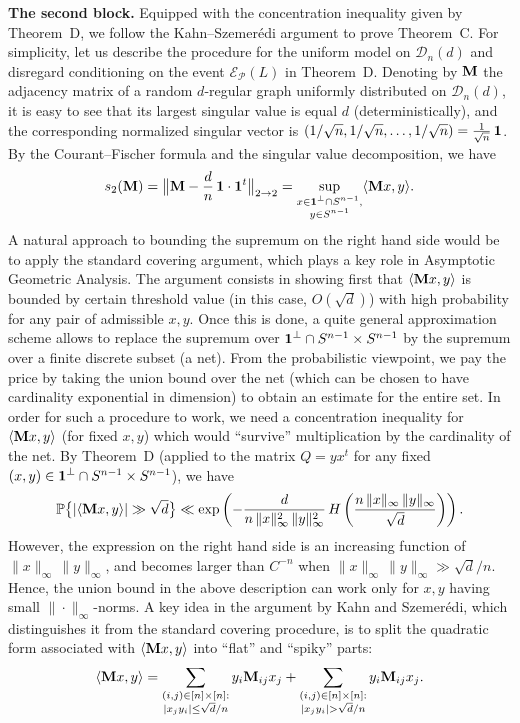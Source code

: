 \documentclass[12pt]{article}
\theoremstyle{definition}
\theoremstyle{plain}
\newcommand{\Event}{\mathcal{E}}
\def\ranmtx{{\bf{}M}}
\def\vofones{{\bf{}1}}
\def\Prob{{\mathbb P}}
\def\DGraphSet{{\mathcal D}_n}
\def\pvector{{\mathcal P}}
\begin{document}
{\bf The second block.} 
Equipped with the concentration inequality given by Theorem~D,
we follow the Kahn--Szemer\'edi argument \cite{FKS} to prove Theorem~C. 
For simplicity, let us describe the procedure for the uniform model on $\DGraphSet(d)$
and disregard conditioning on the event $\Event_\pvector(L)$ in Theorem~D.
Denoting by $\ranmtx$ the adjacency matrix of a random $d$-regular graph uniformly
distributed on $\DGraphSet(d)$,
it is easy to see that its largest singular value is equal $d$ (deterministically), and the corresponding normalized
singular vector is $(1/\sqrt{n},1/\sqrt{n},\ldots,1/\sqrt{n})=\frac{1}{\sqrt{n}}\,\vofones$.
By the Courant--Fischer formula and the singular value decomposition, we have
$$
s_2(\ranmtx)
=\big\Vert \ranmtx-\frac{d}{n}\, \vofones\cdot\vofones^t\big\Vert_{2\to 2}
=\sup_{\substack{x\in  \vofones^\perp\cap S^{n-1},\\ y\in S^{n-1}} } \langle \ranmtx x,y\rangle.
$$
A natural approach to bounding the supremum on the right hand side would be to apply
the standard covering argument, which plays a key role in Asymptotic Geometric Analysis.
The argument
consists in showing first that
$\langle \ranmtx x,y\rangle$ is bounded by certain threshold value (in this case, $O(\sqrt{d})$) with high probability
for any pair of admissible $x,y$. 
Once this is done, a quite general approximation scheme allows to replace the supremum over 
$\vofones^\perp\cap S^{n-1}\times S^{n-1}$ by the supremum over a finite discrete subset (a net).
From the probabilistic viewpoint, we pay the price by taking the union bound over the net
(which can be chosen to have cardinality exponential in dimension)
to obtain an estimate for the entire set.
In order for such a procedure to work,
we need a concentration inequality for $\langle \ranmtx x,y\rangle$ (for fixed $x,y$) which would
``survive'' multiplication by the cardinality of the net.
By Theorem~D (applied to the matrix $Q=yx^t$ for any fixed $(x,y)\in \vofones^\perp\cap S^{n-1}\times S^{n-1}$), 
we have
$$
\Prob\big\{\vert \langle \ranmtx x,y\rangle\vert \gg\sqrt{d}\big\}\ll \exp\left(-\frac{d}{n\,\|x\|_\infty^2\,\|y\|_\infty^2 }
\, H\left(\frac{n\, \|x\|_\infty\, \|y\|_\infty}{\sqrt{d}}\right)\right).
$$
However, the expression on the right hand side is an increasing function of $\|x\|_\infty\, \|y\|_\infty$,
and becomes larger than $C^{-n}$ when $\|x\|_\infty\, \|y\|_\infty\gg \sqrt{d}/n$.
Hence, the union bound in the above description can work only for $x,y$ having small $\|\cdot\|_\infty$-norms.
A key idea in the argument by Kahn and Szemer\'edi, which distinguishes it from the standard covering procedure,
is to split the quadratic form associated with $\langle \ranmtx x,y\rangle$
into ``flat'' and ``spiky'' parts:
\begin{equation}\label{eq: intro-flat-spike}
\langle \ranmtx x,y\rangle
= \sum_{\substack{(i,j)\in [n]\times[n]:\\\vert x_jy_i\vert \leq \sqrt{d}/n}} y_i\ranmtx_{ij}x_j 
+  \sum_{\substack{(i,j)\in[n]\times[n]:\\\vert x_jy_i\vert > \sqrt{d}/n}} y_i\ranmtx_{ij}x_j. 
\end{equation}
\end{document}
